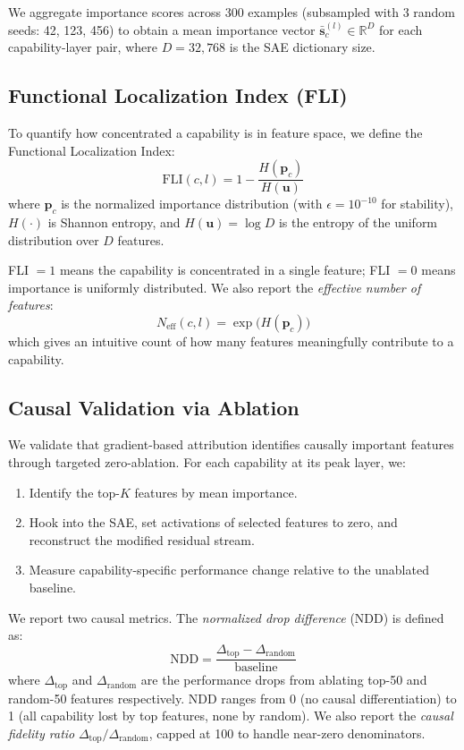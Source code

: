 \documentclass{article}
\newcommand{\fli}{\text{FLI}}
\newcommand{\vp}{\mathbf{p}}
\newcommand{\vu}{\mathbf{u}}
\newcommand{\ndd}{\text{NDD}}
\begin{document}
We aggregate importance scores across 300 examples (subsampled with 3 random seeds: 42, 123, 456) to obtain a mean importance vector $\bar{\mathbf{s}}_c^{(l)} \in \mathbb{R}^{D}$ for each capability-layer pair, where $D = 32{,}768$ is the SAE dictionary size.

\subsection{Functional Localization Index (FLI)}

To quantify how concentrated a capability is in feature space, we define the Functional Localization Index:
\begin{equation}
    \fli(c, l) = 1 - \frac{H(\vp_c)}{H(\vu)}
    \label{eq:fli}
\end{equation}
where $\vp_c$ is the normalized importance distribution (with $\epsilon = 10^{-10}$ for stability), $H(\cdot)$ is Shannon entropy, and $H(\vu) = \log D$ is the entropy of the uniform distribution over $D$ features.

FLI $= 1$ means the capability is concentrated in a single feature; FLI $= 0$ means importance is uniformly distributed. We also report the \emph{effective number of features}:
\begin{equation}
    N_{\text{eff}}(c, l) = \exp\!\bigl(H(\vp_c)\bigr)
\end{equation}
which gives an intuitive count of how many features meaningfully contribute to a capability.

\subsection{Causal Validation via Ablation}

We validate that gradient-based attribution identifies causally important features through targeted zero-ablation. For each capability at its peak layer, we:
\begin{enumerate}
    \item Identify the top-$K$ features by mean importance.
    \item Hook into the SAE, set activations of selected features to zero, and reconstruct the modified residual stream.
    \item Measure capability-specific performance change relative to the unablated baseline.
\end{enumerate}

We report two causal metrics. The \emph{normalized drop difference} (NDD) is defined as:
\begin{equation}
    \ndd = \frac{\Delta_{\text{top}} - \Delta_{\text{random}}}{\text{baseline}}
\end{equation}
where $\Delta_{\text{top}}$ and $\Delta_{\text{random}}$ are the performance drops from ablating top-50 and random-50 features respectively. NDD ranges from 0 (no causal differentiation) to 1 (all capability lost by top features, none by random). We also report the \emph{causal fidelity ratio} $\Delta_{\text{top}} / \Delta_{\text{random}}$, capped at 100 to handle near-zero denominators.
\end{document}
